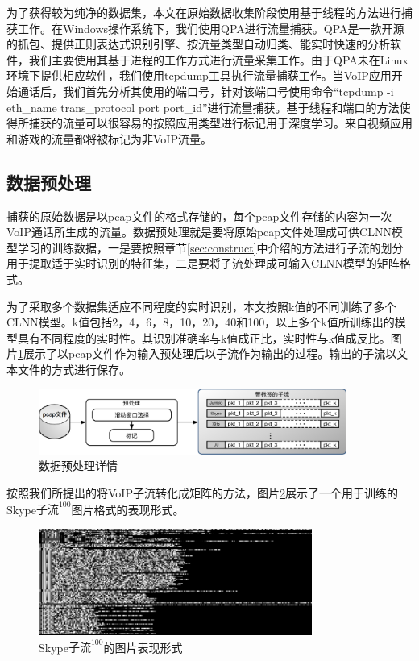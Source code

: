 为了获得较为纯净的数据集，本文在原始数据收集阶段使用基于线程的方法进行捕获工作。在Windows操作系统下，我们使用QPA进行流量捕获。QPA是一款开源的抓包、提供正则表达式识别引擎、按流量类型自动归类、能实时快速的分析软件，我们主要使用其基于进程的工作方式进行流量采集工作。由于QPA未在Linux环境下提供相应软件，我们使用tcpdump工具执行流量捕获工作。当VoIP应用开始通话后，我们首先分析其使用的端口号，针对该端口号使用命令“tcpdump -i eth\_name trans\_protocol port port\_id”进行流量捕获。基于线程和端口的方法使得所捕获的流量可以很容易的按照应用类型进行标记用于深度学习。来自视频应用和游戏的流量都将被标记为非VoIP流量。


\subsection{数据预处理}
捕获的原始数据是以pcap文件的格式存储的，每个pcap文件存储的内容为一次VoIP通话所生成的流量。数据预处理就是要将原始pcap文件处理成可供CLNN模型学习的训练数据，一是要按照章节\ref{sec:construct}中介绍的方法进行子流的划分用于提取适于实时识别的特征集，二是要将子流处理成可输入CLNN模型的矩阵格式。

为了采取多个数据集适应不同程度的实时识别，本文按照k值的不同训练了多个CLNN模型。k值包括2，4，6，8，10，20，40和100，以上多个k值所训练出的模型具有不同程度的实时性。其识别准确率与k值成正比，实时性与k值成反比。图片\ref{fig:datasetprocessing}展示了以pcap文件作为输入预处理后以子流作为输出的过程。输出的子流以文本文件的方式进行保存。

\begin{figure}[htp]
\begin{center}
\includegraphics[width=0.9\textwidth]{figures/datasetprocessing.eps}
\caption{数据预处理详情}\label{fig:datasetprocessing}
\end{center}
\end{figure}



按照我们所提出的将VoIP子流转化成矩阵的方法，图片\ref{fig:skype1}展示了一个用于训练的Skype$\text{子流}^{100}$图片格式的表现形式。

\begin{figure}[htp]
\begin{center}
\includegraphics[width=0.8\textwidth]{figures/skype1.png}
\caption{Skype$\text{子流}^{100}$的图片表现形式}\label{fig:skype1}
\end{center}
\end{figure}


